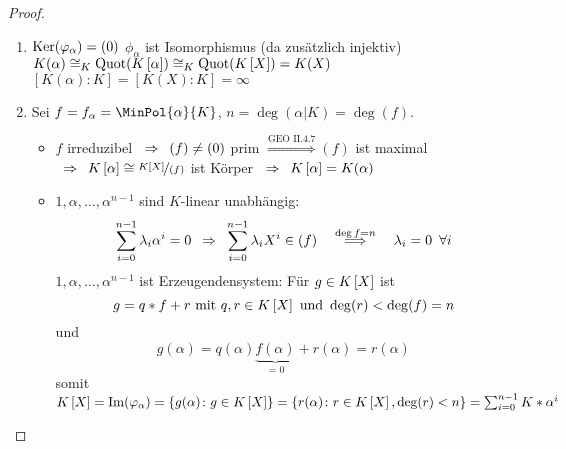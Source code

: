 \begin{proof}
    \begin{enumerate}[leftmargin=*, label=(\alph*)]
        \item $\operatorname{Ker}(\varphi_\alpha) = (0)$ \follows $\phi_\alpha$ ist Isomorphismus (da zusätzlich injektiv) \\
        \follows $K(\alpha) \isomorph_K \Quot(\polynom[K][\alpha]) \isomorph_K \Quot(\polynom[K]) = K(X)$ \\
        \follows $[K(\alpha) \colon K] = [K(X) \colon K] = \infty$
        \item Sei $f = f_\alpha = \MinPol{\alpha}{K}$, $n = \deg(\alpha | K) = \deg(f)$.
        \begin{itemize}
            \item $f$ irreduzibel $\enskip \Rightarrow \enskip (f) \neq (0)$ prim $\overset{\text{GEO II.4.7}}{\Longrightarrow} (f)$ ist maximal \\
            $\follows \polynom[K][\alpha] \isomorph \lfrac{\polynom[K]}{(f)}$ ist Körper $\follows \polynom[K][\alpha] = K(\alpha)$
            \item $1, \alpha, \dots , \alpha^{n-1}$ sind $K$-linear unabhängig: 
            \begin{equation*}
                \sum_{i=0}^{n-1} \lambda_i \alpha^i = 0 \enskip \Rightarrow \enskip \sum_{i=0}^{n-1} \lambda_i X^i \in (f) \quad \overset{\deg f = n}{\Longrightarrow} \quad \lambda_i = 0 \enskip \forall i
            \end{equation*}
            $1, \alpha, \dots , \alpha^{n-1}$ ist Erzeugendensystem: Für $g \in \polynom[K]$ ist 
            \begin{equation*}
                g = q*f + r \text{ mit } q,r \in \polynom[K] \text{ und } \deg(r) < \deg(f) = n
            \end{equation*}
            und  
            \begin{equation*}
                g(\alpha) = q(\alpha) \underbrace{f(\alpha)}_{=0} + r(\alpha) = r(\alpha)
            \end{equation*}
            somit $\polynom[K] = \Image(\phi_\alpha) = \menge{g(\alpha) \colon g \in \polynom[K]} = \menge{r(\alpha) \colon r \in \polynom[K], \deg(r) < n} = \sum_{i=0}^{n-1} K * \alpha^i$
        \end{itemize}
    \end{enumerate}
\end{proof}

